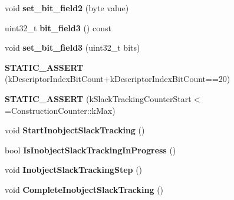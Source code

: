 \begin{DoxyCompactItemize}
\item 
void {\bfseries set\+\_\+bit\+\_\+field2} (byte value)\hypertarget{classv8_1_1internal_1_1_map_ab95b78f0a4924c32aeb284f102242f43}{}\label{classv8_1_1internal_1_1_map_ab95b78f0a4924c32aeb284f102242f43}

\item 
uint32\+\_\+t {\bfseries bit\+\_\+field3} () const \hypertarget{classv8_1_1internal_1_1_map_ad7d2b030da3f5b680879364b7f0edfa7}{}\label{classv8_1_1internal_1_1_map_ad7d2b030da3f5b680879364b7f0edfa7}

\item 
void {\bfseries set\+\_\+bit\+\_\+field3} (uint32\+\_\+t bits)\hypertarget{classv8_1_1internal_1_1_map_a28beaae008820bce825849a558dcf781}{}\label{classv8_1_1internal_1_1_map_a28beaae008820bce825849a558dcf781}

\item 
{\bfseries S\+T\+A\+T\+I\+C\+\_\+\+A\+S\+S\+E\+RT} (k\+Descriptor\+Index\+Bit\+Count+k\+Descriptor\+Index\+Bit\+Count==20)\hypertarget{classv8_1_1internal_1_1_map_a3400fbf7d3172229a68958d8f24e4746}{}\label{classv8_1_1internal_1_1_map_a3400fbf7d3172229a68958d8f24e4746}

\item 
{\bfseries S\+T\+A\+T\+I\+C\+\_\+\+A\+S\+S\+E\+RT} (k\+Slack\+Tracking\+Counter\+Start$<$=Construction\+Counter\+::k\+Max)\hypertarget{classv8_1_1internal_1_1_map_a307e7f2dc42c52312a3b2bae3369f44e}{}\label{classv8_1_1internal_1_1_map_a307e7f2dc42c52312a3b2bae3369f44e}

\item 
void {\bfseries Start\+Inobject\+Slack\+Tracking} ()\hypertarget{classv8_1_1internal_1_1_map_a4e0bbe0069d3f0b11495b17d1318f9e6}{}\label{classv8_1_1internal_1_1_map_a4e0bbe0069d3f0b11495b17d1318f9e6}

\item 
bool {\bfseries Is\+Inobject\+Slack\+Tracking\+In\+Progress} ()\hypertarget{classv8_1_1internal_1_1_map_a77137d27d20dcbee0f88a6cd32d09990}{}\label{classv8_1_1internal_1_1_map_a77137d27d20dcbee0f88a6cd32d09990}

\item 
void {\bfseries Inobject\+Slack\+Tracking\+Step} ()\hypertarget{classv8_1_1internal_1_1_map_a9a5a434aa54bc66e451467878078e3df}{}\label{classv8_1_1internal_1_1_map_a9a5a434aa54bc66e451467878078e3df}

\item 
void {\bfseries Complete\+Inobject\+Slack\+Tracking} ()\hypertarget{classv8_1_1internal_1_1_map_a7a0b89ae71d2873e902926614f40b583}{}\label{classv8_1_1internal_1_1_map_a7a0b89ae71d2873e902926614f40b583}


\end{DoxyCompactItemize}
